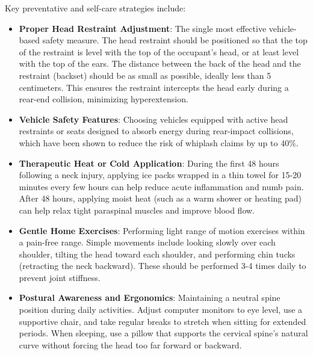 Key preventative and self-care strategies include:
\begin{itemize}
    \item \textbf{Proper Head Restraint Adjustment}: The single most effective vehicle-based safety measure. The head restraint should be positioned so that the top of the restraint is level with the top of the occupant's head, or at least level with the top of the ears. The distance between the back of the head and the restraint (backset) should be as small as possible, ideally less than 5 centimeters. This ensures the restraint intercepts the head early during a rear-end collision, minimizing hyperextension.
    \item \textbf{Vehicle Safety Features}: Choosing vehicles equipped with active head restraints or seats designed to absorb energy during rear-impact collisions, which have been shown to reduce the risk of whiplash claims by up to 40\%.
    \item \textbf{Therapeutic Heat or Cold Application}: During the first 48 hours following a neck injury, applying ice packs wrapped in a thin towel for 15-20 minutes every few hours can help reduce acute inflammation and numb pain. After 48 hours, applying moist heat (such as a warm shower or heating pad) can help relax tight paraspinal muscles and improve blood flow.
    \item \textbf{Gentle Home Exercises}: Performing light range of motion exercises within a pain-free range. Simple movements include looking slowly over each shoulder, tilting the head toward each shoulder, and performing chin tucks (retracting the neck backward). These should be performed 3-4 times daily to prevent joint stiffness.
    \item \textbf{Postural Awareness and Ergonomics}: Maintaining a neutral spine position during daily activities. Adjust computer monitors to eye level, use a supportive chair, and take regular breaks to stretch when sitting for extended periods. When sleeping, use a pillow that supports the cervical spine's natural curve without forcing the head too far forward or backward.
\end{itemize}

